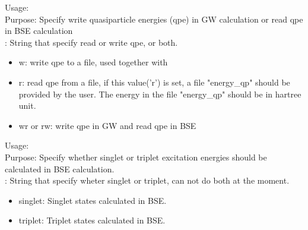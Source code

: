  {
\noindent
Usage:  \\
Purpose: Specify write quasiparticle energies (qpe) in GW calculation or read qpe in BSE calculation \\
: String that specify read or write qpe, or both.
\begin{itemize}
\item w: write qpe to a file, used together with 
\item r: read qpe from a file, if this value('r') is set, a file "energy\_qp" should be provided by the user. The energy in the file "energy\_qp" should be in hartree unit.
\item wr or rw: write qpe in GW and read qpe in BSE
\end{itemize}
}

 {
\noindent
Usage:  \\
Purpose: Specify whether singlet or triplet excitation energies should be calculated in BSE calculation. \\
: String that specify wheter singlet or triplet, can not do both at the moment.
\begin{itemize}
\item singlet: Singlet states calculated in BSE.
\item triplet: Triplet states calculated in BSE.
\end{itemize}
}
